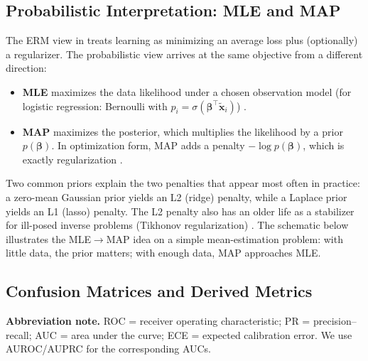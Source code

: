 \FloatBarrier

\subsection{Probabilistic Interpretation: MLE and MAP}
\label{sec:logistic_probabilistic_interpretation_mle_and_map}

The ERM view in  treats learning as minimizing an average loss plus (optionally) a regularizer. The probabilistic view arrives at the same objective from a different direction:
\begin{itemize}
    \item \textbf{MLE} maximizes the data likelihood under a chosen observation model (for logistic regression: Bernoulli with \(p_i=\sigma(\boldsymbol{\beta}^\top\tilde{\mathbf{x}}_i)\)) \citep{Fisher1922}.
    \item \textbf{MAP} maximizes the posterior, which multiplies the likelihood by a prior \(p(\boldsymbol{\beta})\). In optimization form, MAP adds a penalty \(-\log p(\boldsymbol{\beta})\), which is exactly regularization \citep{Bishop1995}.
\end{itemize}
Two common priors explain the two penalties that appear most often in practice: a zero-mean Gaussian prior yields an L2 (ridge) penalty, while a Laplace prior yields an L1 (lasso) penalty. The L2 penalty also has an older life as a stabilizer for ill-posed inverse problems (Tikhonov regularization) \citep{Tikhonov1963}. The schematic below illustrates the MLE\(\rightarrow\)MAP idea on a simple mean-estimation problem: with little data, the prior matters; with enough data, MAP approaches MLE.

\FloatBarrier

\subsection{Confusion Matrices and Derived Metrics}
\label{sec:logistic_confusion_matrices_and_derived_metrics}

\noindent\textbf{Abbreviation note.} ROC = receiver operating characteristic; PR = precision--recall; AUC = area under the curve; ECE = expected calibration error. We use AUROC/AUPRC for the corresponding AUCs.

